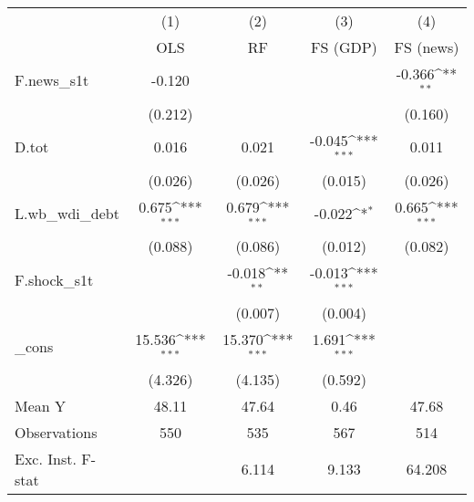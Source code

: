 {
\def\sym#1{\ifmmode^{#1}\else\(^{#1}\)\fi}
\begin{tabular}{l*{4}{c}}
\toprule
            &\multicolumn{1}{c}{(1)}&\multicolumn{1}{c}{(2)}&\multicolumn{1}{c}{(3)}&\multicolumn{1}{c}{(4)}\\
            &\multicolumn{1}{c}{OLS}&\multicolumn{1}{c}{RF}&\multicolumn{1}{c}{FS (GDP)}&\multicolumn{1}{c}{FS (news)}\\
\midrule
F.news\_s1t  &      -0.120         &                     &                     &      -0.366\sym{**} \\
            &     (0.212)         &                     &                     &     (0.160)         \\
\addlinespace
D.tot       &       0.016         &       0.021         &      -0.045\sym{***}&       0.011         \\
            &     (0.026)         &     (0.026)         &     (0.015)         &     (0.026)         \\
\addlinespace
L.wb\_wdi\_debt&       0.675\sym{***}&       0.679\sym{***}&      -0.022\sym{*}  &       0.665\sym{***}\\
            &     (0.088)         &     (0.086)         &     (0.012)         &     (0.082)         \\
\addlinespace
F.shock\_s1t &                     &      -0.018\sym{**} &      -0.013\sym{***}&                     \\
            &                     &     (0.007)         &     (0.004)         &                     \\
\addlinespace
\_cons      &      15.536\sym{***}&      15.370\sym{***}&       1.691\sym{***}&                     \\
            &     (4.326)         &     (4.135)         &     (0.592)         &                     \\
\midrule
Mean Y      &       48.11         &       47.64         &        0.46         &       47.68         \\
Observations&         550         &         535         &         567         &         514         \\
Exc. Inst. F-stat&                     &       6.114         &       9.133         &      64.208         \\
\bottomrule
\end{tabular}
}
